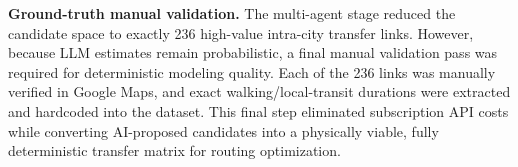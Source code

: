 \medskip

\noindent\textbf{Ground-truth manual validation.}
The multi-agent stage reduced the candidate space to exactly 236 high-value intra-city transfer links. However, because LLM estimates remain probabilistic, a final manual validation pass was required for deterministic modeling quality. Each of the 236 links was manually verified in Google Maps, and exact walking/local-transit durations were extracted and hardcoded into the dataset. This final step eliminated subscription API costs while converting AI-proposed candidates into a physically viable, fully deterministic transfer matrix for routing optimization.

